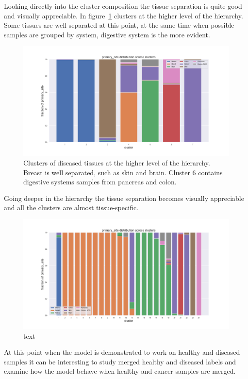 Looking directly into the cluster composition the tissue separation is quite good and visually appreciable. In figure~\ref{fig:topic/tcga/fraction_clustercomposition_l4_primary_site} clusters at the higher level of the hierarchy. Some tissues are well separated at this point, at the same time when possible samples are grouped by system, digestive system is the more evident.
\begin{figure}[htb!]
	\centering
	\includegraphics[width=0.8\linewidth]{pictures/topic/tcga/fraction_clustercomposition_l4_primary_site.png}
	\caption{Clusters of diseased tissues at the higher level of the hierarchy. Breast is well separated, such as skin and brain. Cluster 6 contains digestive systems samples from pancreas and colon.}
	\label{fig:topic/tcga/fraction_clustercomposition_l4_primary_site}
\end{figure}
Going deeper in the hierarchy the tissue separation becomes visually appreciable and all the clusters are almost tissue-specific.
\begin{figure}[htb!]
	\centering
	\includegraphics[width=0.8\linewidth]{pictures/topic/tcga/fraction_clustercomposition_l3_primary_site.png}
	\caption{text}
	\label{fig:topic/tcga/fraction_clustercomposition_l3_primary_site}
\end{figure}

At this point when the model is demonstrated to work on healthy and diseased samples it can be interesting to study merged healthy and diseased labels and examine how the model behave when healthy and cancer samples are merged.